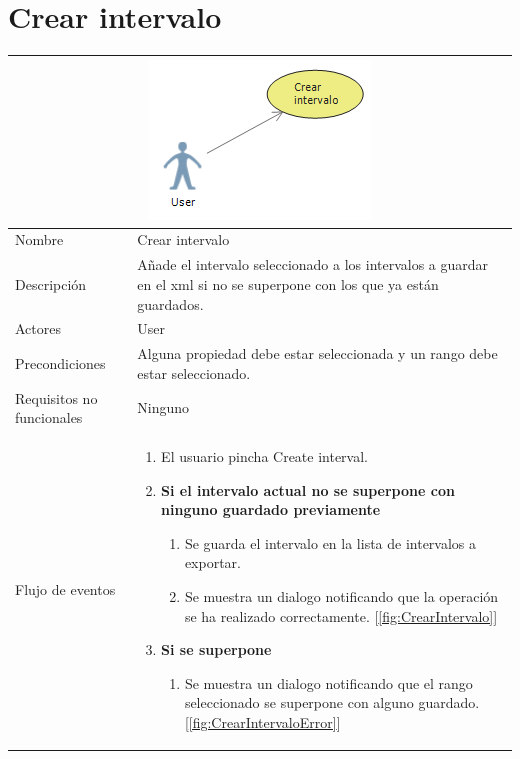 \section{Crear intervalo}
\begin{table}[H]
	\begin{center}
		\begin{tabular}{|l*{1}{p{10cm}}|}
			
			\multicolumn{2}{c}{\includegraphics[width=0.4\linewidth]{./Figures/CrearIntervalo.png}} \\
			\hline
		    Nombre                     & Crear intervalo \\
		    Descripci\'on              & A\~nade el intervalo seleccionado
		    							 a los intervalos a guardar en el xml si
		    							 no se superpone con los que ya est\'an guardados.\\ 
		    Actores                    & User  \\
		    Precondiciones             & Alguna propiedad debe estar seleccionada
		    							 y un rango debe estar seleccionado.  \\
		    Requisitos no funcionales  & Ninguno  \\
		    Flujo de eventos           & \begin{enumerate}
		    								\item El usuario pincha Create interval.
		    								\item \textbf{Si el intervalo actual
		    								no se superpone con ninguno
		    								guardado previamente}
		    								\begin{enumerate}
		    									\item Se guarda el intervalo en la lista
		    									de intervalos a exportar.
		    									\item Se muestra un dialogo notificando que
		    									la operaci\'on se ha realizado correctamente. [\ref{fig:CrearIntervalo}]
		    								\end{enumerate}
		    								\item \textbf{Si se superpone}
		    								\begin{enumerate}
			    								\item Se muestra un dialogo notificando que
		    									el rango seleccionado se superpone con alguno
		    									guardado. [\ref{fig:CrearIntervaloError}]
		    								\end{enumerate}
		    								

\end{enumerate}
\end{tabular}
\end{center}
\end{table}
